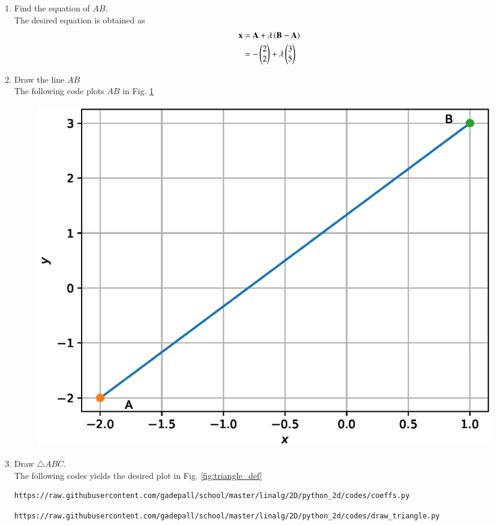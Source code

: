 \documentclass[journal,12pt,twocolumn]{IEEEtran}
\renewcommand\thesection{\arabic{section}}
\begin{document}
\begin{enumerate}[label=\thesection.\arabic*
,ref=\thesection.\theenumi]
\begin{align}
\\
 &= 5 \times 3 + (-3)\times 5 = 0 
\end{align}
\item Find the equation of $AB$.
\\
\solution  The desired equation is obtained as
\begin{align}
\label{eq:line_dir}
\quad \mathbf{x} &= \mathbf{A}+ \lambda \left(\mathbf{B}-\mathbf{A}\right)
\\
&= -\begin{pmatrix}2\\2\end{pmatrix}+ \lambda\begin{pmatrix}3\\5\end{pmatrix}
\end{align}
%
\item Draw the line $AB$
\\
\solution The following code plots $AB$ in Fig. \ref{fig:draw_line}

%
\begin{figure}
\centering
\includegraphics[width=\columnwidth]{./figs/draw_line.eps}
\caption{}
\label{fig:draw_line}
\end{figure}

\item Draw $\triangle ABC$.
\\
\solution
The following codes yields the desired plot in Fig. \ref{fig:triangle_def}
\begin{lstlisting}
https://raw.githubusercontent.com/gadepall/school/master/linalg/2D/python_2d/codes/coeffs.py
\end{lstlisting}
\begin{lstlisting}
https://raw.githubusercontent.com/gadepall/school/master/linalg/2D/python_2d/codes/draw_triangle.py
\end{lstlisting}


\end{enumerate}
\end{document}
